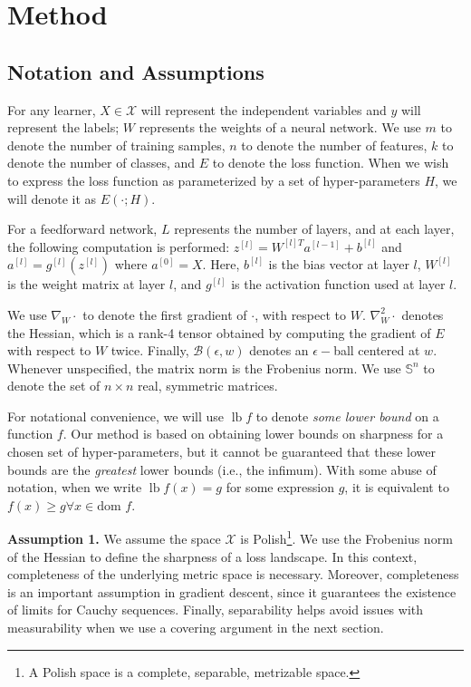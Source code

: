 \documentclass[preprint,12pt]{elsarticle}
\DeclareMathOperator*{\lb}{lb}
\begin{document}
\section{Method}

\subsection{Notation and Assumptions}

For any learner, $X \in \mathcal{X}$ will represent the independent variables and $y$ will represent the labels; $W$ represents the weights of a neural network. We use $m$ to denote the number of training samples, $n$ to denote the number of features, $k$ to denote the number of classes, and $E$ to denote the loss function. When we wish to express the loss function as parameterized by a set of hyper-parameters $H$, we will denote it as $E(\cdot; H)$.

For a feedforward network, $L$ represents the number of layers, and at each layer, the following computation is performed:
       $ z^{[l]} = W^{[l]T}a^{[l-1]} + b^{[l]} \label{eq:zl}$
       and
        $a^{[l]}  = g^{[l]}(z^{[l]})$ where
        $a^{[0]} = X$.
Here, $b^{[l]}$ is the bias vector at layer $l$, $W^{[l]}$ is the weight matrix at layer $l$, and $g^{[l]}$ is the activation function used at layer $l$. 

We use $\nabla_W \cdot$ to denote the first gradient of $\cdot$, with respect to $W$. $\nabla^2_W \cdot$ denotes the Hessian, which is a rank-4 tensor obtained by computing the gradient of $E$ with respect to $W$ twice. Finally, $\mathcal{B}(\epsilon, w)$ denotes an $\epsilon-$ball centered at $w$. Whenever unspecified, the matrix norm is the Frobenius norm. We use $\mathbb{S}^n$ to denote the set of $n\times n$ real, symmetric matrices. 

For notational convenience, we will use $\lb f$ to denote \textit{some lower bound} on a function $f$. Our method is based on obtaining lower bounds on sharpness for a chosen set of hyper-parameters, but it cannot be guaranteed that these lower bounds are the \textit{greatest} lower bounds (i.e., the infimum). With some abuse of notation, when we write $\lb f(x) = g$ for some expression $g$, it is equivalent to $f(x) \geq g \forall x \in \text{dom } f$.

\textbf{Assumption 1.} We assume the space $\mathcal{X}$ is Polish\footnote{A Polish space is a complete, separable, metrizable space.}. We use the Frobenius norm of the Hessian to define the sharpness of a loss landscape. In this context, completeness of the underlying metric space is necessary. Moreover, completeness is an important assumption in gradient descent, since it guarantees the existence of limits for Cauchy sequences.  Finally, separability helps avoid issues with measurability when we use a covering argument in the next section. 
\end{document}
